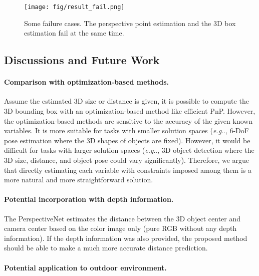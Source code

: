 \documentclass{article}
\makeatletter
\DeclareRobustCommand\onedot{\futurelet\@let@token\@onedot}
\def\@onedot{\ifx\@let@token.\else.\null\fi\xspace}
\def\eg{\emph{e.g}\onedot} \def\Eg{\emph{E.g}\onedot}
\makeatother
\begin{document}
\begin{figure}[t!]
    \begin{center}
        \texttt{[image: fig/result\_fail.png]}
    \end{center}
    \vspace{-3pt}
    \caption{Some failure cases. The perspective point estimation and the 3D box estimation fail at the same time.}
    \label{fig:result_fail}
    \vspace{9pt}
\end{figure}

\subsection{Discussions and Future Work}

\paragraph{Comparison with optimization-based methods.}

Assume the estimated 3D size or distance is given, it is possible to compute the 3D bounding box with an optimization-based method like efficient PnP. However, the optimization-based methods are sensitive to the accuracy of the given known variables. It is more suitable for tasks with smaller solution spaces (\eg, 6-DoF pose estimation where the 3D shapes of objects are fixed). However, it would be difficult for tasks with larger solution spaces (\eg, 3D object detection where the 3D size, distance, and object pose could vary significantly). Therefore, we argue that directly estimating each variable with constraints imposed among them is a more natural and more straightforward solution.

\paragraph{Potential incorporation with depth information.}

The PerspectiveNet estimates the distance between the 3D object center and camera center based on the color image only (pure RGB without any depth information). If the depth information was also provided, the proposed method should be able to make a much more accurate distance prediction.

\paragraph{Potential application to outdoor environment.}
\end{document}
